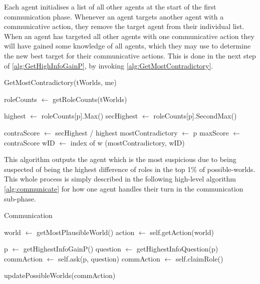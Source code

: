 \setcounter{algorithmcaption}{3}
Each agent initialises a list of all other agents at the
start of the first communication phase. Whenever an agent targets another agent
with a communicative action, they remove the target agent from their individual
list. When an agent has targeted all other agents with one communicative action
they will have gained some knowledge of all agents, which they may use to determine 
the new best target for their communicative
actions. This is done in the next step of \cref{alg:GetHighInfoGainP},
by invoking \cref{alg:GetMostContradictory}.
\begin{algorithm}[H]
	\caption{GetMostContradictory(tWorlds, me)}
	\begin{algorithmic}
		\State roleCounts $\gets$ getRoleCounts(tWorlds)

		\State highest $\gets$ roleCounts[p].Max()
		\State secHighest $\gets$ roleCounts[p].SecondMax()

		\State contraScore $\gets$ secHighest / highest
		\State mostContradictory $\gets$ p
		\State maxScore $\gets$ contraScore
		\State wID $\gets$ index of w
		\EndIf
		\EndFor
		\EndFor
		\State \Return (mostContradictory, wID)
	\end{algorithmic}\label{alg:GetMostContradictory}
\end{algorithm}
\setcounter{algorithmcaption}{4}
This algorithm outputs the agent which is the most suspicious due to being
suspected of being the highest difference of roles in the top 1\% of possible-worlds.\\
This whole process is simply described in the following high-level algorithm
\ref{alg:communicate} for how one agent handles their turn in the communication
sub-phase.
\begin{algorithm}[H]
	\caption{Communication}
	\begin{algorithmic}[1]
		\State world $\gets$ getMostPlausibleWorld()
		\State action $\gets$ self.getAction(world)

		\State p $\gets$ getHighestInfoGainP()
		\State question $\gets$ getHighestInfoQuestion(p)
		\State commAction $\gets$ self.ask(p, question)
		\State commAction $\gets$ self.claimRole()
		\EndIf

		\State updatePossibleWorlds(commAction)
		\EndFunction
	\end{algorithmic}\label{alg:communicate}
\end{algorithm}

